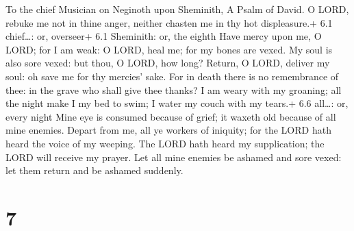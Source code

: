 To the chief Musician on Neginoth upon Sheminith, A Psalm of David.
 O LORD, rebuke me not in thine anger, neither chasten me in
thy hot displeasure.+ 6.1 chief\ldots: or, overseer+ 6.1 Sheminith: or,
the eighth  Have mercy upon me, O LORD; for I am weak: O
LORD, heal me; for my bones are vexed.  My soul is also sore
vexed: but thou, O LORD, how long?  Return, O LORD, deliver
my soul: oh save me for thy mercies' sake.  For in death
there is no remembrance of thee: in the grave who shall give thee
thanks?  I am weary with my groaning; all the night make I
my bed to swim; I water my couch with my tears.+ 6.6 all\ldots: or,
every night  Mine eye is consumed because of grief; it
waxeth old because of all mine enemies.  Depart from me, all
ye workers of iniquity; for the LORD hath heard the voice of my weeping.
 The LORD hath heard my supplication; the LORD will receive
my prayer.  Let all mine enemies be ashamed and sore vexed:
let them return and be ashamed suddenly.

\hypertarget{section-6}{%
\section{7}\label{section-6}}

